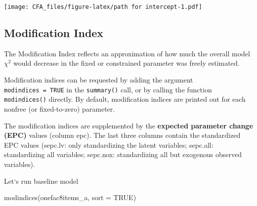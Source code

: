 \documentclass[
]{article}
\newenvironment{Shaded}{\begin{snugshade}}{\end{snugshade}}
\newcommand{\AttributeTok}[1]{\textcolor[rgb]{0.77,0.63,0.00}{#1}}
\newcommand{\ConstantTok}[1]{\textcolor[rgb]{0.00,0.00,0.00}{#1}}
\newcommand{\FunctionTok}[1]{\textcolor[rgb]{0.00,0.00,0.00}{#1}}
\newcommand{\NormalTok}[1]{#1}
\begin{document}
\texttt{[image: CFA\_files/figure-latex/path for intercept-1.pdf]}

\hypertarget{modification-index}{%
\subsection{Modification Index}\label{modification-index}}

The Modification Index reflects an approximation of how much the overall
model \(\chi^{2}\) would decrease in the fixed or constrained parameter
was freely estimated.

Modification indices can be requested by adding the argument
\texttt{modindices\ =\ TRUE} in the \texttt{summary()} call, or by
calling the function \texttt{modindices()} directly. By default,
modification indices are printed out for each nonfree (or fixed-to-zero)
parameter.

The modification indices are supplemented by the \textbf{expected
parameter change (EPC)} values (column epc). The last three columns
contain the standardized EPC values (sepc.lv: only standardizing the
latent variables; sepc.all: standardizing all variables; sepc.nox:
standardizing all but exogenous observed variables).

Let`s run baseline model

\begin{Shaded}
\begin{Highlighting}[]
\FunctionTok{modindices}\NormalTok{(onefac8items\_a, }\AttributeTok{sort =} \ConstantTok{TRUE}\NormalTok{)}
\end{Highlighting}
\end{Shaded}
\end{document}
